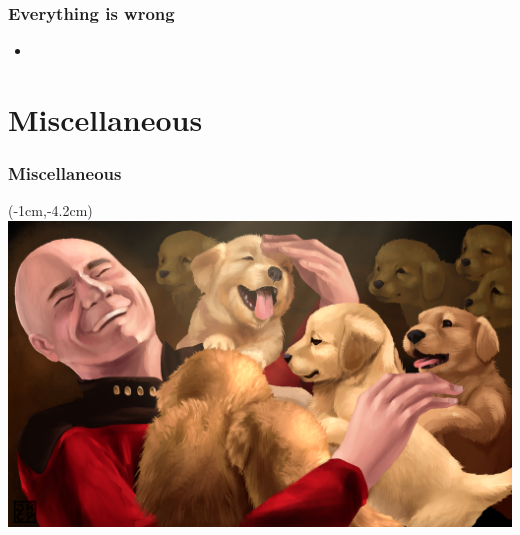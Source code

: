 \documentclass[notes,xelatex,13pt]{beamer}
\begin{document}
\begin{frame}
	\frametitle{Everything is wrong}
	\begin{itemize}
		\item 
	\end{itemize}
	
\end{frame}

\section{Miscellaneous}
\begin{frame}
	\frametitle{Miscellaneous}
\end{frame}

\begin{frame}[plain]
\begin{textblock*}{0cm}(-1cm,-4.2cm)
	\includegraphics[width=1.0\paperwidth]{picardpuppy.png}
\end{textblock*}
\end{frame}
\end{document}
